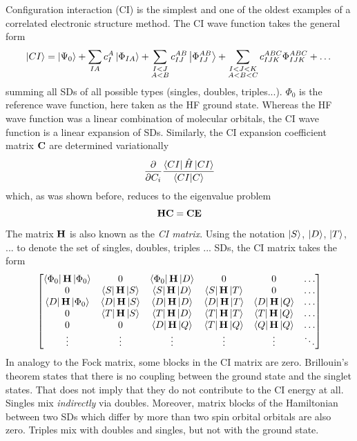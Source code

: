 Configuration interaction (CI) is the simplest and one of the oldest examples of a correlated electronic structure method. The CI wave function takes the general form
\begin{equation}
\ket{CI} = \ket{\Psi_0} + \sum_{IA} c_{I}^{A} \ket{\Phi_{IA}} + \sum_{\substack{I < J \\ A < B}} c_{IJ}^{AB} \ket{\Phi_{IJ}^{AB}} + \sum_{\substack{I < J < K \\ A < B < C}} c_{IJK}^{ABC} \Phi_{IJK}^{ABC} + \dots
\end{equation}
\noindent summing all SDs of all possible types (singles, doubles, triples...). $\Phi_0$ is the reference wave function, here taken as the HF ground state. Whereas the HF wave function was a linear combination of molecular orbitals, the CI wave function is a linear expansion of SDs. Similarly, the CI expansion coefficient matrix $\mathbf{C}$ are determined variationally
\begin{equation}
\frac{\partial}{\partial C_i} \frac{\bra{CI}\hat{H}\ket{CI}}{\bra{CI}\ket{C}}
\end{equation}
\noindent which, as was shown before, reduces to the eigenvalue problem
\begin{equation}
\mathbf{H}\mathbf{C} = \mathbf{C}\mathbf{E}
\end{equation}
\noindent The matrix $\mathbf{H}$ is also known as the \emph{CI matrix}. Using the notation $\ket{S}$, $\ket{D}$, $\ket{T}$, ... to denote the set of singles, doubles, triples ... SDs, the CI matrix takes the form
\begin{equation}
\begin{bmatrix}
\bra{\Phi_0}\mathbf{H}\ket{\Phi_0} & 0 & \bra{\Phi_0}\mathbf{H}\ket{D} & 0 & 0 & \ldots \\
0 & \bra{S}\mathbf{H}\ket{S} & \bra{S}\mathbf{H}\ket{D} & \bra{S}\mathbf{H}\ket{T} & 0 & \ldots \\
\bra{D}\mathbf{H}\ket{\Phi_0} & \bra{D}\mathbf{H}\ket{S} & \bra{D}\mathbf{H}\ket{D} & \bra{D}\mathbf{H}\ket{T} & \bra{D}\mathbf{H}\ket{Q} & \ldots \\
0 & \bra{T}\mathbf{H}\ket{S} & \bra{T}\mathbf{H}\ket{D} & \bra{T}\mathbf{H}\ket{T} & \bra{T}\mathbf{H}\ket{Q} & \ldots \\
0 & 0 & \bra{D}\mathbf{H}\ket{Q} & \bra{T}\mathbf{H}\ket{Q} & \bra{Q}\mathbf{H}\ket{Q} & \ldots \\
\vdots & \vdots & \vdots & \vdots & \vdots & \ddots  
\end{bmatrix}
\end{equation}
\noindent In analogy to the Fock matrix, some blocks in the CI matrix are zero. Brillouin's theorem states that there is no coupling between the ground state and the singlet states. That does not imply that they do not contribute to the CI energy at all. Singles mix \emph{indirectly} via doubles. Moreover, matrix blocks of the Hamiltonian between two SDs which differ by more than two spin orbital orbitals are also zero. Triples mix with doubles and singles, but not with the ground state.

